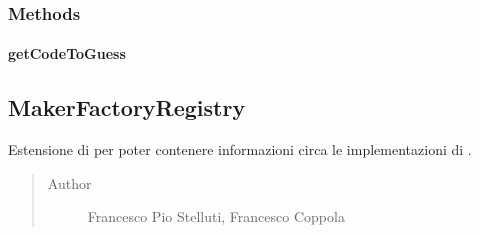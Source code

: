 \documentclass[letterpaper,10pt,italian,openany,oneside]{sphinxmanual}
\begin{document}
\subsubsection{Methods}
\label{\detokenize{source/it/unicam/cs/pa/mastermind/players/InteractiveMaker:methods}}

\paragraph{getCodeToGuess}
\label{\detokenize{source/it/unicam/cs/pa/mastermind/players/InteractiveMaker:getcodetoguess}}

\begin{fulllineitems}
\label{\detokenize{source/it/unicam/cs/pa/mastermind/players/InteractiveMaker:it.unicam.cs.pa.mastermind.players.InteractiveMaker.getCodeToGuess(InteractionView)}}
\end{fulllineitems}



\subsection{MakerFactoryRegistry}
\label{\detokenize{source/it/unicam/cs/pa/mastermind/players/MakerFactoryRegistry:makerfactoryregistry}}\label{\detokenize{source/it/unicam/cs/pa/mastermind/players/MakerFactoryRegistry::doc}}

\begin{fulllineitems}
\label{\detokenize{source/it/unicam/cs/pa/mastermind/players/MakerFactoryRegistry:it.unicam.cs.pa.mastermind.players.MakerFactoryRegistry}}
Estensione di  per poter contenere informazioni circa le implementazioni di .
\begin{quote}\begin{description}
\item[{Author}] \leavevmode
Francesco Pio Stelluti, Francesco Coppola

\end{description}\end{quote}

\end{fulllineitems}
\end{document}
